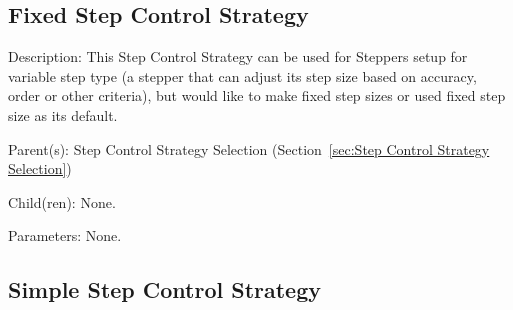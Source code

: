 \subsection{Fixed Step Control Strategy}
\label{sec:Fixed Step Control Strategy}

\begin{list}{}
  {\setlength{\leftmargin}{1.0in}
   \setlength{\labelwidth}{0.75in}
   \setlength{\labelsep}{0.125in}}
  \item[Description:]
    This Step Control Strategy can be used for Steppers setup for variable step type (a stepper that can adjust its step size based on accuracy, order or other criteria), but would like to make fixed step sizes or used fixed step size as its default.
  \item[Parent(s):]
    Step Control Strategy Selection (Section~\ref{sec:Step Control Strategy Selection})
  \item[Child(ren):]
    None. 
  \item[Parameters:]
    None. 
\end{list}

\subsection{Simple Step Control Strategy}
\label{sec:Simple Step Control Strategy}

